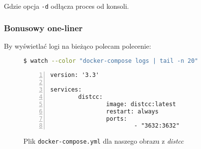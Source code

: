 \documentclass[a4paper,12pt]{article}
\begin{document}
Gdzie opcja \texttt{-d} odłącza proces od konsoli.

\subsubsection*{Bonusowy one-liner}
By wyświetlać logi na bieżąco polecam polecenie:
\begin{figure}[H]
    \begin{lstlisting}[frame=single,basicstyle=\footnotesize\ttfamily,language=bash,morekeywords={tail,docker-compose,watch}]
$ watch --color "docker-compose logs | tail -n 20"
    \end{lstlisting}
\end{figure}


\begin{figure}[p]
    \begin{lstlisting}[frame=L,basicstyle=\footnotesize\ttfamily,numbers=left,
        morekeywords={version,services,image,ports,restart}]
version: '3.3'

services:
        distcc:
                image: distcc:latest
                restart: always
                ports:
                        - "3632:3632"
    \end{lstlisting}
    \caption{Plik \texttt{docker-compose.yml} dla naszego obrazu z \emph{distcc}}
    \label{dockercompose}
\end{figure}
\tableofcontents


\end{document}
